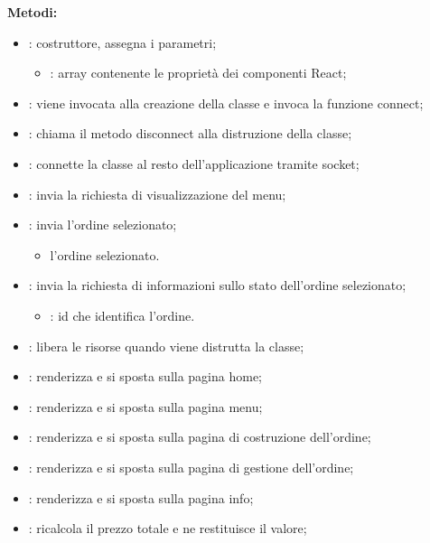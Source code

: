 \textbf{Metodi:}
\begin{itemize}
	\item {}: costruttore, assegna i parametri;
		\begin{itemize}
			\item {}: array contenente le proprietà dei componenti React;
		\end{itemize}
	\item {}: viene invocata alla creazione della classe e invoca la funzione connect;
	\item {}: chiama il metodo disconnect alla distruzione della classe;
	\item {}: connette la classe al resto dell'applicazione tramite socket;
	\item {}: invia la richiesta di visualizzazione del menu;
	\item {}: invia l'ordine selezionato;
		\begin{itemize}
			\item {} l'ordine selezionato.
		\end{itemize}
	\item {}: invia la richiesta di informazioni sullo stato dell'ordine selezionato;
		\begin{itemize}
			\item {}: id che identifica l'ordine.
		\end{itemize}
	\item {}: libera le risorse quando viene distrutta la classe;
	\item {}: renderizza e si sposta sulla pagina home;
	\item {}: renderizza e si sposta sulla pagina menu;
	\item {}: renderizza e si sposta sulla pagina di costruzione dell'ordine;
	\item {}: renderizza e si sposta sulla pagina di gestione dell'ordine; 
	\item {}: renderizza e si sposta sulla pagina info;
	\item {}: ricalcola il prezzo totale e ne restituisce il valore;

\end{itemize}

